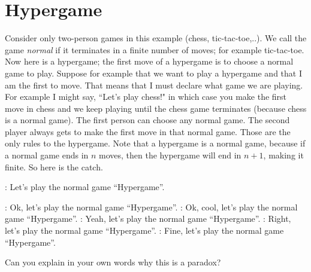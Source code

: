 \section{Hypergame}


\begin{example}[Hypergame]
Consider only two-person games in this example (chess, tic-tac-toe,..). We call the game \emph{normal} if it terminates in a finite number of moves; for example tic-tac-toe. Now here is a hypergame; the first move of a hypergame is to choose a normal game to play. Suppose for example that we want to play a hypergame and that I am the first to move. That means that I must declare what game we are playing. For example I might say, ``Let's play chess!" in which case you make the first move in chess and we keep playing until the chess game terminates (because chess is a normal game). The first person can choose any normal game. The second player always gets to make the first move in that normal game. Those are the only rules to the hypergame.  Note that a hypergame is a normal game, because if a normal game ends in $n$ moves, then the hypergame will end in $n+1$, making it finite.  So here is the catch.  
\begin{drama}

  \youspeaks: Let's play the normal game ``Hypergame''.  

  \mespeaks: Ok, let's play the normal game ``Hypergame''.  
  \youspeaks: Ok, cool, let's play the normal game ``Hypergame''.  
  \mespeaks: Yeah, let's play the normal game ``Hypergame''.  
  \youspeaks: Right, let's play the normal game ``Hypergame''.  
  \mespeaks: Fine, let's play the normal game ``Hypergame''.  
\end{drama}
Can you explain in your own words why this is a paradox?
\end{example}
